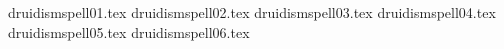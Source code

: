 

\tablepassive{\druidismpassive}{\druidismpassivedef}
\tablelabels
{druidismspell01.tex}%
\spellrule
{druidismspell02.tex}%
\spellrule
{druidismspell03.tex}%
\spellrule
{druidismspell04.tex}%
\spellrule
{druidismspell05.tex}%
\spellrule
{druidismspell06.tex}%
\closetable{}
